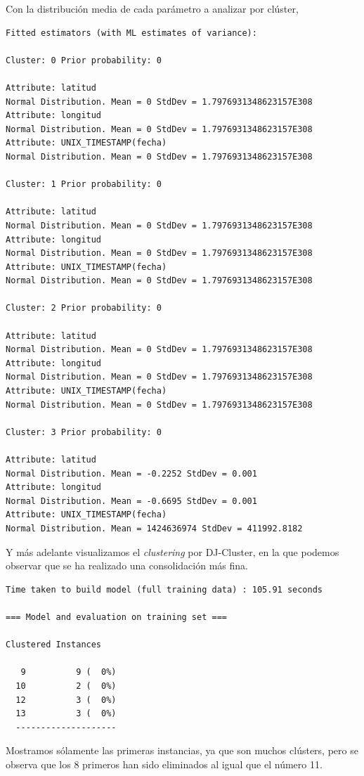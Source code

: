 \documentclass[a4paper, 12pt]{article}
\begin{document}
Con la distribuci\'on media de cada par\'ametro a analizar por cl\'uster,\\

\begin{verbatim}
Fitted estimators (with ML estimates of variance):

Cluster: 0 Prior probability: 0

Attribute: latitud
Normal Distribution. Mean = 0 StdDev = 1.7976931348623157E308
Attribute: longitud
Normal Distribution. Mean = 0 StdDev = 1.7976931348623157E308
Attribute: UNIX_TIMESTAMP(fecha)
Normal Distribution. Mean = 0 StdDev = 1.7976931348623157E308

Cluster: 1 Prior probability: 0

Attribute: latitud
Normal Distribution. Mean = 0 StdDev = 1.7976931348623157E308
Attribute: longitud
Normal Distribution. Mean = 0 StdDev = 1.7976931348623157E308
Attribute: UNIX_TIMESTAMP(fecha)
Normal Distribution. Mean = 0 StdDev = 1.7976931348623157E308

Cluster: 2 Prior probability: 0

Attribute: latitud
Normal Distribution. Mean = 0 StdDev = 1.7976931348623157E308
Attribute: longitud
Normal Distribution. Mean = 0 StdDev = 1.7976931348623157E308
Attribute: UNIX_TIMESTAMP(fecha)
Normal Distribution. Mean = 0 StdDev = 1.7976931348623157E308

Cluster: 3 Prior probability: 0

Attribute: latitud
Normal Distribution. Mean = -0.2252 StdDev = 0.001
Attribute: longitud
Normal Distribution. Mean = -0.6695 StdDev = 0.001
Attribute: UNIX_TIMESTAMP(fecha)
Normal Distribution. Mean = 1424636974 StdDev = 411992.8182

\end{verbatim}

Y m\'as adelante visualizamos el \textit{clustering} por DJ-Cluster, en la que podemos observar que se ha realizado una consolidaci\'on m\'as fina.

\begin{verbatim}
Time taken to build model (full training data) : 105.91 seconds

=== Model and evaluation on training set ===

Clustered Instances

   9          9 (  0%)
  10          2 (  0%)
  12          3 (  0%)
  13          3 (  0%)
  --------------------
\end{verbatim}

Mostramos s\'olamente las primeras instancias, ya que son muchos cl\'usters, pero se observa que los 8 primeros han sido eliminados al igual que el n\'umero 11.
\end{document}
